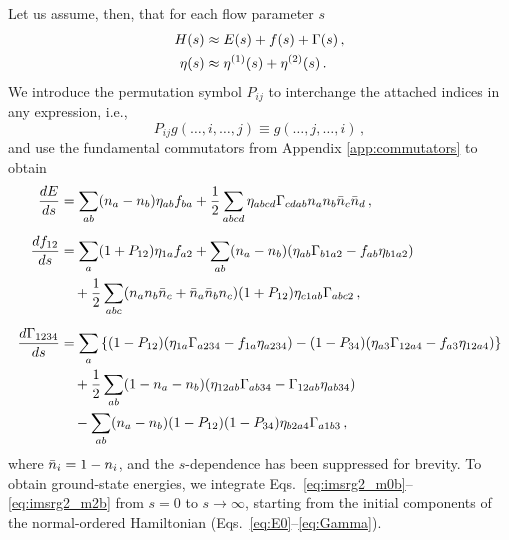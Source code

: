Let us assume, then, that for each flow parameter $s$
\begin{align}
  H(s) &\approx E(s) + f(s) + \Gamma(s)\,,\\
  \eta(s) &\approx\eta^{(1)}(s)+\eta^{(2)}(s)\,.
\end{align}
We introduce the permutation symbol $P_{ij}$ to interchange the attached indices in any expression, i.e.,
\begin{equation}\label{eq:def_Pij}
  P_{ij} g(\ldots,i,\ldots,j) \equiv g(\ldots,j,\ldots,i)\,,
\end{equation}
and use the fundamental commutators from Appendix \ref{app:commutators} to obtain
%
\begin{align}
  \totd{E}{s}&= \sum_{ab}(n_a-n_b)\eta_{ab} f_{ba} 
    + \frac{1}{2} \sum_{abcd}\eta_{abcd}\Gamma_{cdab} n_a n_b\bar{n}_c\bar{n}_d
    \label{eq:imsrg2_m0b}\,,\\[5pt]
% 
  \totd{f_{12}}{s} &= 
  \sum_{a}(1+P_{12})\eta_{1a}f_{a2} +\sum_{ab}(n_a-n_b)(\eta_{ab}\Gamma_{b1a2}-f_{ab}\eta_{b1a2}) \notag\\ 
  &\quad +\frac{1}{2}\sum_{abc}(n_an_b\bar{n}_c+\bar{n}_a\bar{n}_bn_c) (1+P_{12})\eta_{c1ab}\Gamma_{abc2}
  \label{eq:imsrg2_m1b}\,,\\[5pt]
% 
  \totd{\Gamma_{1234}}{s}&= 
  \sum_{a}\left\{ 
    (1-P_{12})(\eta_{1a}\Gamma_{a234}-f_{1a}\eta_{a234} )
    -(1-P_{34})(\eta_{a3}\Gamma_{12a4}-f_{a3}\eta_{12a4} )
    \right\}\notag \\
  &\quad+ \frac{1}{2}\sum_{ab}(1-n_a-n_b)(\eta_{12ab}\Gamma_{ab34}-\Gamma_{12ab}\eta_{ab34})
    \notag\\
  &\quad-\sum_{ab}(n_a-n_b) (1-P_{12})(1-P_{34})\eta_{b2a4}\Gamma_{a1b3}
    \label{eq:imsrg2_m2b}\,,
\end{align}
where $\bar{n}_i=1-n_i$, and the $s$-dependence has been suppressed for brevity. To obtain ground-state energies, we integrate Eqs.~\eqref{eq:imsrg2_m0b}--\eqref{eq:imsrg2_m2b} from $s=0$ to $s\to\infty$, starting from the initial 
components of the normal-ordered Hamiltonian (Eqs.~\eqref{eq:E0}--\eqref{eq:Gamma}).

